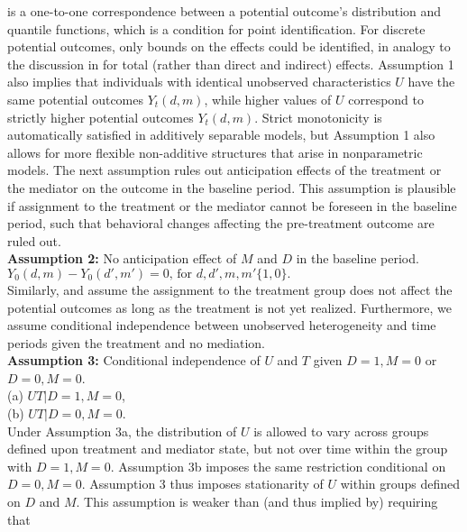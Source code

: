 \documentclass[a4paper,12pt]{article}
\begin{document}
 \doublespacing \pagestyle{plain}
is a one-to-one correspondence between a potential outcome's distribution and quantile functions, which is a condition for point identification. For discrete potential outcomes, only bounds on the effects could be identified, in analogy to the discussion in  for total (rather than direct and indirect) effects. Assumption 1 also implies that individuals with identical unobserved characteristics $U$ have the same potential outcomes $Y_t(d,m)$, while higher values of $U$ correspond to strictly higher potential outcomes $Y_t(d,m)$. Strict monotonicity is automatically satisfied in additively separable models, but Assumption 1 also allows for more flexible non-additive structures that arise in nonparametric models. 
The next assumption rules out anticipation effects of the treatment or the mediator on the outcome in the baseline period. This assumption is plausible if assignment to the treatment or the mediator cannot be foreseen in the baseline period, such that behavioral changes affecting the pre-treatment outcome are ruled out.\vspace{5 pt}\\
\textbf{Assumption 2:} No anticipation effect of $M$ and $D$ in the baseline period.\\
$Y_0(d,m) - Y_0(d',m') = 0\mbox{, for } d, d', m, m' \{1,0\}.$
\vspace{5 pt}\\
Similarly,  and  assume the assignment to the treatment group does not affect the potential outcomes as long as the treatment is not yet realized. %
Furthermore, we assume conditional independence between unobserved heterogeneity and time periods given the treatment and no mediation. \vspace{5 pt}\\
\textbf{Assumption 3:} Conditional independence of $U$ and  $T$ given $D=1,M=0$ or $D=0,M=0$.\\
(a) $U T|D=1,M=0$,\\
(b) $U T|D=0,M=0$.\vspace{5 pt}\\
Under Assumption 3a, the distribution of $U$ is allowed to vary across groups defined upon treatment and mediator state, but not over time within the group with $D=1,M=0$. Assumption 3b imposes the same restriction conditional on $D=0,M=0$. Assumption 3 thus imposes stationarity of $U$ within groups defined on $D$ and $M$. This assumption is weaker than (and thus implied by) requiring that
\end{document}
